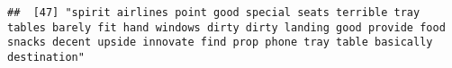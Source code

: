 \documentclass[
]{article}
\begin{document}
\begin{verbatim}
##  [47] "spirit airlines point good special seats terrible tray tables barely fit hand windows dirty dirty landing good provide food snacks decent upside innovate find prop phone tray table basically destination"                                                                                                                                                                                                                                                                                                                                                                                                                                                                                                                                                                                                                                                                                                                                                                                                                                                                                                                                                                                                                                                                                                                                                                                                                                                                                                                                                                                                                                                                                                                                                                                    

\end{verbatim}
\end{document}

